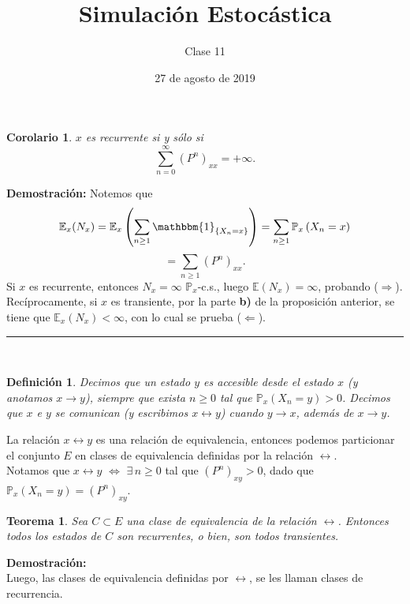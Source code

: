 \documentclass[a4paper]{article}
\title{Simulación Estocástica}
\author{Clase 11}
\date{27 de agosto de 2019}
\newcommand{\prob}{\mathbb{P}}
\newtheorem{definicion}{Definición}
\newtheorem{teorema}{Teorema}
\newtheorem{cor}{Corolario}
\numberwithin{equation}{subsection}
\numberwithin{definicion}{subsection}
\def\E{\mathbb E}
\begin{document}
\maketitle

\begin{cor}
$x$ es recurrente si y sólo si
\[\sum_{n=0}^{\infty}\left(P^n\right)_{xx} = +\infty.\]
\end{cor}
\textbf{Demostración: }Notemos que
\[\E_x(N_x) = \E_x\left(\sum_{n\geq 1}\mathbbm{1}_{\{X_n=x\}}\right) = \sum_{n\geq 1}\prob_x\left(X_n=x\right)\]
\[= \sum_{n\geq 1}\left(P^n\right)_{xx}.\]
Si $x$ es recurrente, entonces $N_x=\infty$ $\prob_x$-c.s., luego $\E(N_x)=\infty$, probando ($\Longrightarrow$).\\ \newline
Recíprocamente, si $x$ es transiente, por la parte \textbf{b)} de la proposición anterior, se tiene que $\E_x(N_x)<\infty$, con lo cual se prueba ($\Longleftarrow$).\\
\rule{0.7em}{0.7em}\\ \newline

\begin{definicion}
Decimos que un estado $y$ es accesible desde el estado $x$ (y anotamos $x\rightarrow y$), siempre que exista $n\geq 0$ tal que $\prob_x\left(X_n=y\right)>0$. Decimos que $x$ e $y$ se comunican (y escribimos $x\leftrightarrow y$) cuando $y\rightarrow x$,  además de $x\rightarrow y$. 
\end{definicion}

La relación $x\leftrightarrow y$ es una relación de equivalencia, entonces podemos particionar el conjunto $E$ en clases de equivalencia definidas por la relación $\leftrightarrow$.\\
Notamos que $x\leftrightarrow y$ $\Longleftrightarrow$ $\exists\,n\geq 0$ tal que $\left(P^n\right)_{xy}>0$, dado que $\prob_x\left(X_n=y\right)=\left(P^n\right)_{xy}$.  \\ \newline

\begin{teorema}
Sea $C\subset E$ una clase de equivalencia de la relación $\leftrightarrow$. Entonces todos los estados de $C$ son recurrentes, o bien, son todos transientes.
\end{teorema}

\textbf{Demostración: }\cite[págs. 26- Teo.4.5]{Pard}\\ \newline
Luego, las clases de equivalencia definidas por $\leftrightarrow$, se les llaman clases de recurrencia.
\end{document}
